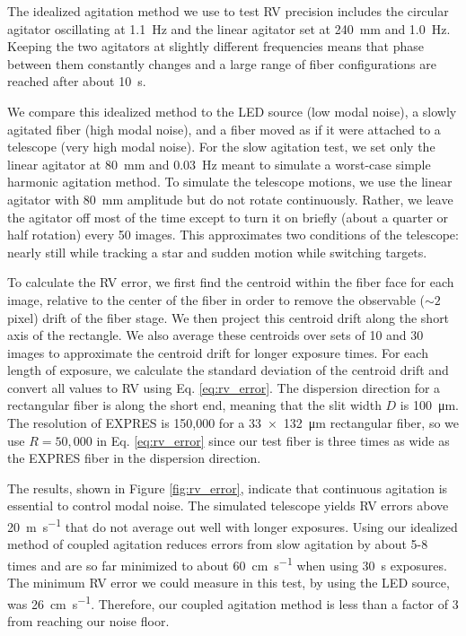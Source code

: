 \documentclass[twocolumn]{emulateapj}
\begin{document}
The idealized agitation method we use to test RV precision includes the circular agitator oscillating at \SI{1.1}{\hertz} and the linear agitator set at \SI{240}{\milli\meter} and \SI{1.0}{\hertz}. Keeping the two agitators at slightly different frequencies means that phase between them constantly changes and a large range of fiber configurations are reached after about \SI{10}{\second}.

We compare this idealized method to the LED source (low modal noise), a slowly agitated fiber (high modal noise), and a fiber moved as if it were attached to a telescope (very high modal noise). For the slow agitation test, we set only the linear agitator at \SI{80}{\milli\meter} and \SI{0.03}{\hertz} meant to simulate a worst-case simple harmonic agitation method. To simulate the telescope motions, we use the linear agitator with \SI{80}{\milli\meter} amplitude but do not rotate continuously. Rather, we leave the agitator off most of the time except to turn it on briefly (about a quarter or half rotation) every 50 images. This approximates two conditions of the telescope: nearly still while tracking a star and sudden motion while switching targets.

To calculate the RV error, we first find the centroid within the fiber face for each image, relative to the center of the fiber in order to remove the observable ($\sim 2$ pixel) drift of the fiber stage. We then project this centroid drift along the short axis of the rectangle. We also average these centroids over sets of 10 and 30 images to approximate the centroid drift for longer exposure times. For each length of exposure, we calculate the standard deviation of the centroid drift and convert all values to RV using Eq. \ref{eq:rv_error}. The dispersion direction for a rectangular fiber is along the short end, meaning that the slit width $D$ is \SI{100}{\micro\meter}. The resolution of EXPRES is 150,000 for a \SI{33x132}{\micro\meter} rectangular fiber, so we use $R=50,000$ in Eq. \ref{eq:rv_error} since our test fiber is three times as wide as the EXPRES fiber in the dispersion direction.

The results, shown in Figure \ref{fig:rv_error}, indicate that continuous agitation is essential to control modal noise. The simulated telescope yields RV errors above \SI{20}{\meter\per\second} that do not average out well with longer exposures. Using our idealized method of coupled agitation reduces errors from slow agitation by about 5-8 times and are so far minimized to about \SI{60}{\centi\meter\per\second} when using \SI{30}{\second} exposures. The minimum RV error we could measure in this test, by using the LED source, was \SI{26}{\centi\meter\per\second}. Therefore, our coupled agitation method is less than a factor of 3 from reaching our noise floor.
\end{document}
